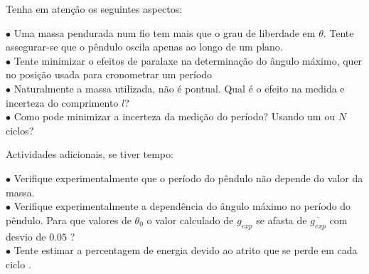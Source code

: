 \documentclass[a4paper,12pt]{article}      %
\begin{document}
\smallskip

Tenha em atenção os seguintes aspectos:
 \begin{flushleft}
	 $\bullet$ Uma massa pendurada num fio tem mais que o grau de liberdade em $\theta$. Tente assegurar-se que o pêndulo oscila apenas ao longo de um plano. \\
	 $\bullet$ Tente minimizar o efeitos de paralaxe na determinação do ângulo máximo, quer no posição usada para cronometrar um período  \\
	 $\bullet$ Naturalmente a massa utilizada, não é pontual. Qual é o efeito  na medida e incerteza do comprimento $l$? \\	
	 $\bullet$ Como pode minimizar a incerteza da medição do período? Usando um ou $N$ ciclos? \\
\end{flushleft} 


Actividades adicionais, se tiver tempo:
 \begin{flushleft}
	 $\bullet$ Verifique experimentalmente que o período do pêndulo não depende do valor da massa.\\
	 $\bullet$ Verifique experimentalmente a dependência do ângulo máximo no período do pêndulo. 
	 Para que valores de $\theta_0$ o valor calculado de $g_{exp}$ se afasta de $\overline{g_{exp}}$ com desvio de $0.05$ ?\\
	 $\bullet$ Tente estimar a percentagem de energia devido ao atrito que se perde em cada ciclo .
\end{flushleft} 

 


\end{document}
